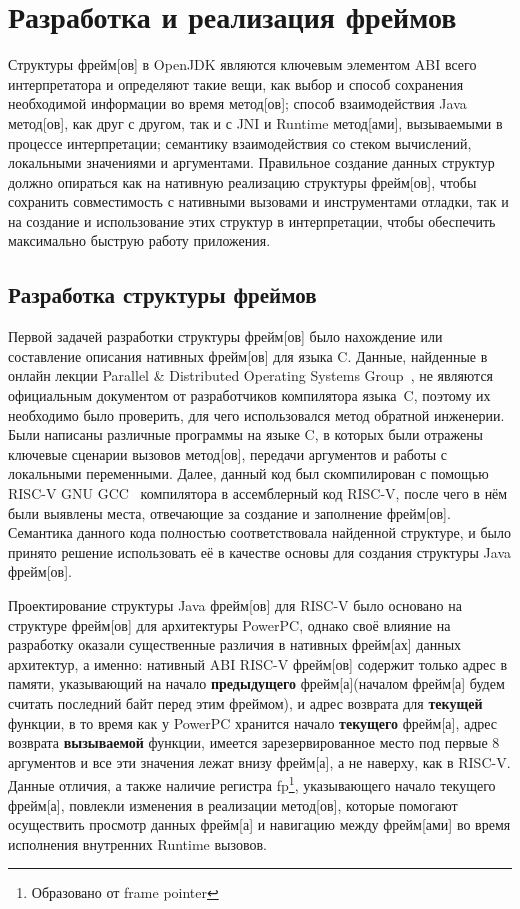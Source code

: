 \section{Разработка и реализация фреймов}

Структуры \gls{фрейм}[ов] в OpenJDK являются ключевым элементом ABI всего интерпретатора и определяют такие вещи, как выбор и способ сохранения необходимой информации во время  \gls{метод}[ов]; способ взаимодействия Java \gls{метод}[ов], как друг с другом, так и с JNI и Runtime \gls{метод}[ами], вызываемыми в процессе интерпретации; семантику взаимодействия со стеком вычислений, локальными значениями и аргументами. Правильное создание данных структур должно опираться как на нативную реализацию структуры \gls{фрейм}[ов], чтобы сохранить совместимость с нативными вызовами и инструментами отладки, так и на создание и использование этих структур в интерпретации, чтобы обеспечить максимально быструю работу приложения.


\subsection{Разработка структуры фреймов}

Первой задачей разработки структуры \gls{фрейм}[ов] было нахождение или составление описания нативных \gls{фрейм}[ов] для языка C. Данные, найденные в онлайн лекции Parallel \& Distributed Operating Systems Group~\cite{lecture:frames}, не являются официальным документом от разработчиков компилятора языка~C, поэтому их необходимо было проверить, для чего использовался \gls{метод} обратной инженерии. Были написаны различные программы на языке C, в которых были отражены ключевые сценарии вызовов \gls{метод}[ов], передачи аргументов и работы с локальными переменными. Далее, данный код был скомпилирован с помощью RISC-V GNU GCC~\cite{riscv:gnu} компилятора в ассемблерный код RISC-V, после чего в нём были выявлены места, отвечающие за создание и заполнение \gls{фрейм}[ов]. Семантика данного кода полностью соответствовала найденной структуре, и было принято решение использовать её в качестве основы для создания структуры Java \gls{фрейм}[ов]. 

Проектирование структуры Java \gls{фрейм}[ов] для RISC-V было основано на структуре \gls{фрейм}[ов] для архитектуры PowerPC, однако своё влияние на разработку оказали существенные различия в нативных \gls{фрейм}[ах] данных архитектур, а именно: нативный ABI RISC-V \gls{фрейм}[ов] содержит только адрес в памяти, указывающий на начало \textbf{предыдущего} \gls{фрейм}[а](началом \gls{фрейм}[а] будем считать последний байт перед этим фреймом), и адрес возврата для \textbf{текущей} функции, в то время как у PowerPC хранится начало \textbf{текущего} \gls{фрейм}[а], адрес возврата \textbf{вызываемой} функции, имеется зарезервированное место под первые 8 аргументов и все эти значения лежат внизу \gls{фрейм}[а], а не наверху, как в RISC-V.
Данные отличия, а также наличие регистра fp\footnote{Образовано от frame pointer}, указывающего начало текущего \gls{фрейм}[а], повлекли изменения в реализации \gls{метод}[ов], которые помогают осуществить просмотр данных \gls{фрейм}[а] и навигацию между \gls{фрейм}[ами] во время исполнения внутренних Runtime вызовов.

